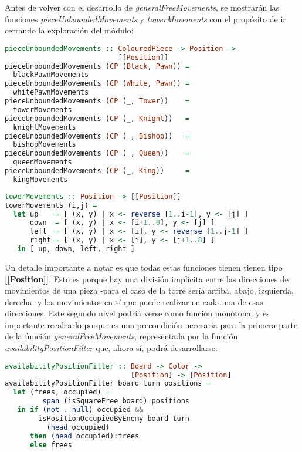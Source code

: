 \documentclass{llncs}
\begin{document}
Antes de volver con el desarrollo de \textit{generalFreeMovements}, se mostrarán las funciones \textit{pieceUnboundedMovements} y \textit{towerMovements} con el propósito de ir cerrando la exploración del módulo:

\begin{lstlisting}[frame=single, language=haskell, captionpos=b, caption=Función pieceUnboundedMovements, label={lst:piece_unbounded_movements}]
pieceUnboundedMovements :: ColouredPiece -> Position ->
                           [[Position]]
pieceUnboundedMovements (CP (Black, Pawn)) =
  blackPawnMovements
pieceUnboundedMovements (CP (White, Pawn)) =
  whitePawnMovements
pieceUnboundedMovements (CP (_, Tower))    =
  towerMovements
pieceUnboundedMovements (CP (_, Knight))   =
  knightMovements
pieceUnboundedMovements (CP (_, Bishop))   =
  bishopMovements
pieceUnboundedMovements (CP (_, Queen))    =
  queenMovements
pieceUnboundedMovements (CP (_, King))     =
  kingMovements
\end{lstlisting}

\begin{lstlisting}[frame=single, language=haskell, captionpos=b, caption=Función towerMovements, label={lst:tower_movements}]
towerMovements :: Position -> [[Position]]
towerMovements (i,j) =
  let up    = [ (x, y) | x <- reverse [1..i-1], y <- [j] ]
      down  = [ (x, y) | x <- [i+1..8], y <- [j] ]
      left  = [ (x, y) | x <- [i], y <- reverse [1..j-1] ]
      right = [ (x, y) | x <- [i], y <- [j+1..8] ]
   in [ up, down, left, right ]
\end{lstlisting}

Un detalle importante a notar es que todas estas funciones tienen tienen tipo \textbf{[[Position]]}. Esto es porque hay una división implícita entre las direcciones de movimientos de una pieza -para el caso de la torre sería arriba, abajo, izquierda, derecha- y los movimientos en sí que puede realizar en cada una de esas direcciones. Este segundo nivel podría verse como función monótona, y es importante recalcarlo porque es una precondición necesaria para la primera parte de la función \textit{generalFreeMovements}, representada por la función \textit{availabilityPositionFilter} que, ahora sí, podrá desarrollarse:


\begin{lstlisting}[frame=single, language=haskell, captionpos=b, caption=Función availabilityPositionFilter, label={lst:availability_position_filter}]
availabilityPositionFilter :: Board -> Color ->
                              [Position] -> [Position]
availabilityPositionFilter board turn positions =
  let (frees, occupied) =
         span (isSquareFree board) positions
   in if (not . null) occupied &&
        isPositionOccupiedByEnemy board turn
          (head occupied)
      then (head occupied):frees
      else frees
\end{lstlisting}
\end{document}

